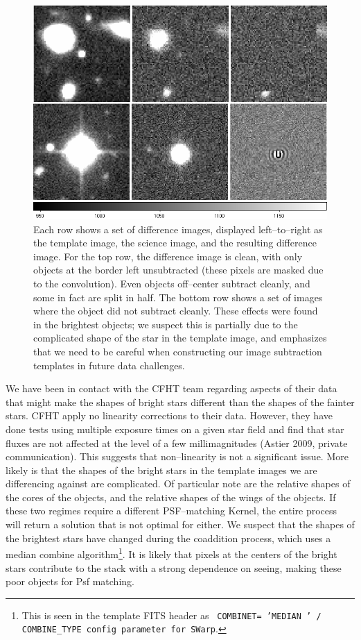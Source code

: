 \begin{figure}[htp]
\centering
\includegraphics[width=6in]{images/diffim.png}
\caption[Example difference images.]
{ Each row shows a set of difference images, displayed left--to--right
as the template image, the science image, and the resulting difference
image.  For the top row, the difference image is clean, with only
objects at the border left unsubtracted (these pixels are masked due
to the convolution).  Even objects off--center subtract cleanly, and
some in fact are split in half.  The bottom row shows a set of images
where the object did not subtract cleanly.  These effects were found
in the brightest objects; we suspect this is partially due to the
complicated shape of the star in the template image, and emphasizes
that we need to be careful when constructing our image subtraction
templates in future data challenges.  }
\label{fig:diffim}
\end{figure}

We have been in contact with the CFHT team regarding aspects of their
data that might make the shapes of bright stars different than the
shapes of the fainter stars.  CFHT apply no linearity corrections to
their data.  However, they have done tests using multiple exposure
times on a given star field and find that star fluxes are not affected
at the level of a few millimagnitudes (Astier 2009, private
communication).  This suggests that non--linearity is not a
significant issue.  More likely is that the shapes of the bright stars
in the template images we are differencing against are complicated.
Of particular note are the relative shapes of the cores of the
objects, and the relative shapes of the wings of the objects.  If
these two regimes require a different PSF--matching Kernel, the entire
process will return a solution that is not optimal for either.  We
suspect that the shapes of the brightest stars have changed during the
coaddition process, which uses a median combine
algorithm\footnote{This is seen in the template FITS header as {\tt
COMBINET= 'MEDIAN ' / COMBINE\_TYPE config parameter for SWarp}.}.  It
is likely that pixels at the centers of the bright stars contribute to
the stack with a strong dependence on seeing, making these poor
objects for Psf matching.

